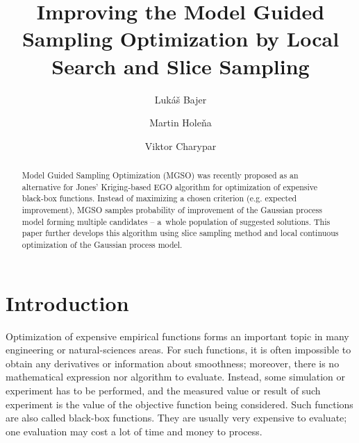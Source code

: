 \documentclass{itatnew}
\begin{document}
\title{Improving the Model Guided Sampling Optimization
  by Local Search and Slice Sampling}

\author{Lukáš Bajer \and Martin Holeňa \and Viktor Charypar }


\maketitle              %

\begin{abstract}
Model Guided Sampling Optimization (MGSO) was recently proposed as an alternative for Jones' Kriging-based EGO algorithm for optimization of expensive black-box functions. Instead of maximizing a chosen criterion (e.g. expected improvement), MGSO samples probability of improvement of the Gaussian process model forming multiple candidates -- a~whole population of suggested solutions. This paper further develops this algorithm using slice sampling method and local continuous optimization of the Gaussian process model.
\end{abstract}

\section{Introduction}
%
Optimization of expensive empirical functions forms an important topic in many engineering or natural-sciences areas. For such functions, it is often impossible to obtain any derivatives or information about smoothness; moreover, there is no mathematical expression nor algorithm to evaluate. Instead, some simulation or experiment has to be performed, and the measured value or result of such experiment is the value of the objective function being considered. Such functions are also called black-box functions. 
They are usually very expensive to evaluate; one evaluation may cost a lot of time and money to process.
\end{document}
